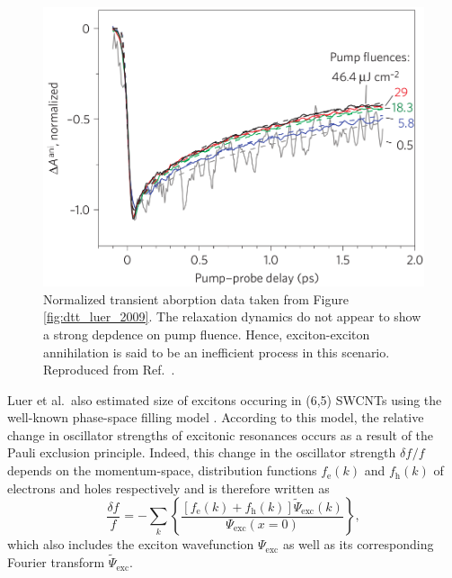 \begin{figure}[ht]
	\centering
	\includegraphics[scale=1.2]{images/chapter_prior_works/dtt_3_luer_2009}
	\caption{Normalized transient aborption data taken from Figure \ref{fig:dtt_luer_2009}. The relaxation dynamics do not appear to show a strong depdence on pump fluence. Hence, exciton-exciton annihilation is said to be an inefficient process in this scenario. Reproduced from Ref.\ \cite{luer2009size}.}
	\label{fig:dtt_2_luer_2009}
\end{figure}

Luer et al.\ also estimated size of excitons occuring in (6,5) SWCNTs using the well-known phase-space filling model \cite{schmitt1985theory, greene1990all}. According to this model, the relative change in oscillator strengths of excitonic resonances occurs as a result of the Pauli exclusion principle. Indeed, this change in the oscillator strength $\delta f_\text{}/ f_\text{}$ depends on the momentum-space, distribution functions $f_\text{e}(k)$ and $f_\text{h}(k)$ of electrons and holes respectively and is therefore written as
\begin{equation}
	\frac{\delta f_\text{}}{f_\text{}} = - \sum_{k} \left\{ \frac{ [ f_\text{e}(k) + f_\text{h}(k)] \tilde{\Psi}_\text{exc}(k)}{\Psi_\text{exc}(x=0)} \right\},
	\label{eq:osc_strength}
\end{equation}
which also includes the exciton wavefunction $\Psi_\text{exc}$ as well as its corresponding Fourier transform $\tilde{\Psi}_\text{exc}$.



